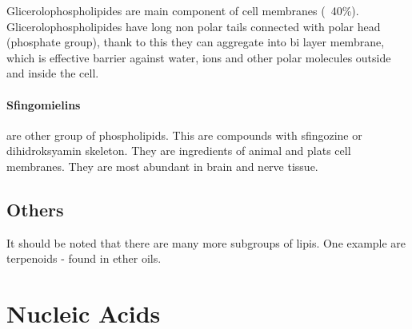 \documentclass{article}
\begin{document}
Glicerolophospholipides are main component of cell membranes (~40\%). 
Glicerolophospholipides have long non polar tails connected with polar head (phosphate 
group), thank to this they can aggregate into bi layer membrane, which is effective 
barrier against water, ions and other polar molecules outside and inside the cell.

\paragraph{Sfingomielins} are other group of phospholipids. This are compounds
with sfingozine or dihidroksyamin skeleton. They are ingredients of animal and plats
cell membranes. They are most abundant in brain and nerve tissue.

\subsection{Others}
It should be noted that there are many more subgroups of lipis. One example are
terpenoids - found in ether oils.
\section{Nucleic Acids}
\end{document}
